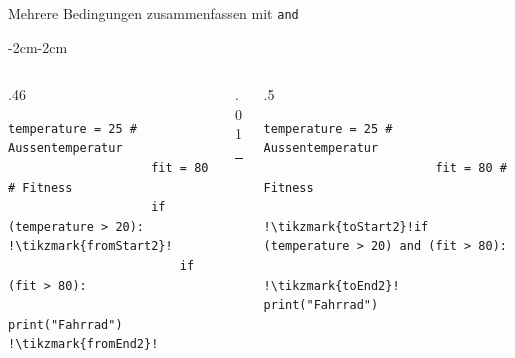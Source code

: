 \begin{frame}[fragile]{Mehrere Bedingungen zusammenfassen mit \lstinline|and|}
    \begin{adjustwidth}{-2cm}{-2cm}
        \begin{columns}
            \begin{column}{.46\pagewidth}
                \begin{lstlisting}[escapechar=!, basicstyle=\footnotesize\ttfamily]
                    temperature = 25 # Aussentemperatur
                    fit = 80 # Fitness
                    if (temperature > 20):   !\tikzmark{fromStart2}!
                        if (fit > 80):
                            print("Fahrrad") !\tikzmark{fromEnd2}!
                \end{lstlisting}
            \end{column}
            \begin{column}{.01\pagewidth}
                \rule{0.4pt}{\textheight}
            \end{column}
            \begin{column}{.5\pagewidth}
                \begin{lstlisting}[escapechar=!, basicstyle=\footnotesize\ttfamily]
                        temperature = 25 # Aussentemperatur
                        fit = 80 # Fitness 
                        !\tikzmark{toStart2}!if (temperature > 20) and (fit > 80):
                        !\tikzmark{toEnd2}!   print("Fahrrad")
        \end{lstlisting}
            \end{column}
        \end{columns}
    \end{adjustwidth}
\end{frame}

